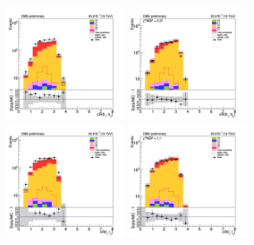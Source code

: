 




\begin{figure}[tbp]
  \begin{center}
    \includegraphics[width=0.31\textwidth]{figures/ee_300_SR_april21/dR_bjets_ee_SR_prefit_plot_apr21.png}
    \includegraphics[width=0.31\textwidth]{figures/ee_300_SR_april21/dR_bjets_ee_SR_FullPostfit_plot_apr21.png}\\
    \includegraphics[width=0.31\textwidth]{figures/ee_300_SR_april21/dR_leps_ee_SR_prefit_plot_apr21.png}
    \includegraphics[width=0.31\textwidth]{figures/ee_300_SR_april21/dR_leps_ee_SR_FullPostfit_plot_apr21.png}\\

\end{center}
\end{figure}
